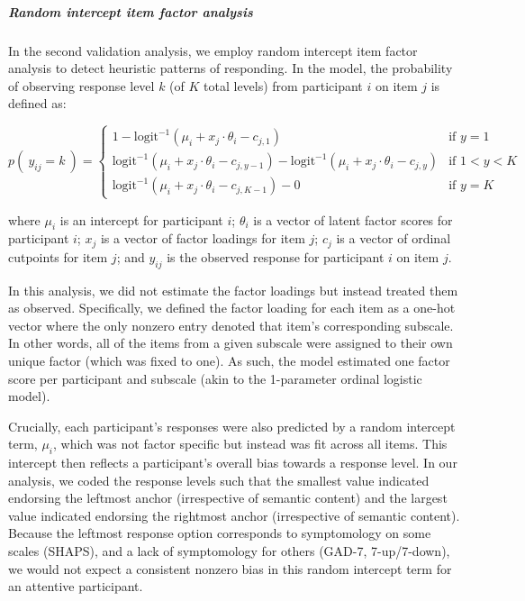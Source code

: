 \documentclass[a4paper,notitlepage,12pt]{article}
\begin{document}
\subparagraph{Random intercept item factor analysis} In the second validation analysis, we employ random intercept item factor analysis \cite{maydeu2006random} to detect heuristic patterns of responding. In the model, the probability of observing response level $k$ (of $K$ total levels) from participant $i$ on item $j$ is defined as:

\begin{equation*}
    p( \ y_{ij} = k \ ) = \left\{ \begin{array}{ll}
1 - \text{logit}^{-1}( \mu_i + x_j\cdot \theta_i - c_{j,1})  &  \text{if } y = 1 \\[4pt]
\text{logit}^{-1}( \mu_i + x_j\cdot \theta_i - c_{j,y-1}) - \text{logit}^{-1}( \mu_i + x_j\cdot \theta_i - c_{j,y}) & \text{if } 1 < y < K \\[4pt]
\text{logit}^{-1}( \mu_i + x_j\cdot \theta_i - c_{j,K-1}) - 0  &  \text{if } y = K
\end{array} \right.
\end{equation*}

where $\mu_i$ is an intercept for participant $i$; $\theta_i$ is a vector of latent factor scores for participant $i$; $x_j$ is a vector of factor loadings for item $j$; $c_j$ is a vector of ordinal cutpoints for item $j$; and $y_{ij}$ is the observed response for participant $i$ on item $j$.

In this analysis, we did not estimate the factor loadings but instead treated them as observed. Specifically, we defined the factor loading for each item as a one-hot vector where the only nonzero entry denoted that item's corresponding subscale. In other words, all of the items from a given subscale were assigned to their own unique factor (which was fixed to one). As such, the model estimated one factor score per participant and subscale (akin to the 1-parameter ordinal logistic model).

Crucially, each participant's responses were also predicted by a random intercept term, $\mu_i$, which was not factor specific but instead was fit across all items. This intercept then reflects a participant's overall bias towards a response level. In our analysis, we coded the response levels such that the smallest value indicated endorsing the leftmost anchor (irrespective of semantic content) and the largest value indicated endorsing the rightmost anchor (irrespective of semantic content). Because the leftmost response option corresponds to symptomology on some scales (SHAPS), and a lack of symptomology for others (GAD-7, 7-up/7-down), we would not expect a consistent nonzero bias in this random intercept term for an attentive participant. 
\end{document}

